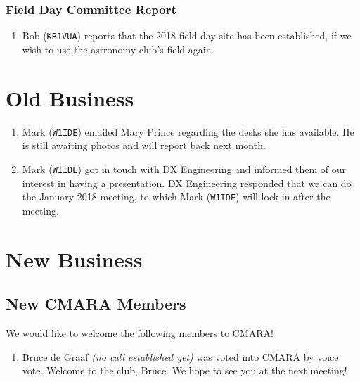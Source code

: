 \documentclass[10pt,letterpaper]{article}
\begin{document}
\subsubsection{Field Day Committee Report}
\begin{enumerate}
  \item Bob (\texttt{KB1VUA}) reports that the 2018 field day site has been established, if we wish to use the astronomy club's field again.
\end{enumerate}

\section{Old Business}
\begin{enumerate}
  \item Mark (\texttt{W1IDE}) emailed Mary Prince regarding the desks she has available. He is still awaiting photos and will report back next month.
  \item Mark (\texttt{W1IDE}) got in touch with DX Engineering and informed them of our interest in having a presentation. DX Engineering responded that we can do the January 2018 meeting, to which Mark (\texttt{W1IDE}) will lock in after the meeting.
\end{enumerate}

\section{New Business}

\subsection{New CMARA Members}
\label{new-cmara-members}
We would like to welcome the following members to CMARA!
\begin{enumerate}
  \item Bruce de Graaf \emph{(no call established yet)} was voted into CMARA by voice vote. Welcome to the club, Bruce. We hope to see you at the next meeting!
\end{enumerate}
\end{document}

